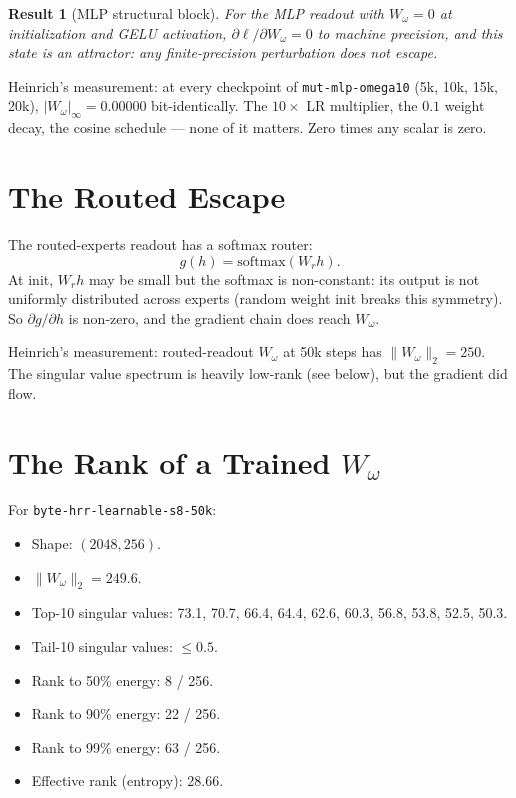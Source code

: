 \documentclass[11pt,openany]{book}
\theoremstyle{definition}
\theoremstyle{plain}
\newtheorem{result}{Result}[chapter]
\newcommand{\omegaproj}{W_\omega}
\begin{document}
\begin{result}[MLP structural block]
For the MLP readout with $\omegaproj = 0$ at initialization and GELU
activation, $\partial \ell / \partial \omegaproj = 0$ to machine
precision, and this state is an attractor: any finite-precision
perturbation does not escape.
\end{result}

Heinrich's measurement: at every checkpoint of \texttt{mut-mlp-omega10}
(5k, 10k, 15k, 20k), $|\omegaproj|_\infty = 0.00000$ bit-identically.
The $10\times$ LR multiplier, the $0.1$ weight decay, the cosine
schedule --- none of it matters. Zero times any scalar is zero.

\section{The Routed Escape}

The routed-experts readout has a softmax router:
\begin{equation}
  g(h) = \mathrm{softmax}(W_r h).
\end{equation}
At init, $W_r h$ may be small but the softmax is non-constant: its output
is not uniformly distributed across experts (random weight init breaks
this symmetry). So $\partial g / \partial h$ is non-zero, and the gradient
chain does reach $\omegaproj$.

Heinrich's measurement: routed-readout $\omegaproj$ at 50k steps has
$\|\omegaproj\|_2 = 250$. The singular value spectrum is heavily
low-rank (see below), but the gradient did flow.

\section{The Rank of a Trained $\omegaproj$}

For \texttt{byte-hrr-learnable-s8-50k}:
\begin{itemize}
  \item Shape: $(2048, 256)$.
  \item $\|\omegaproj\|_2 = 249.6$.
  \item Top-10 singular values: 73.1, 70.7, 66.4, 64.4, 62.6, 60.3,
    56.8, 53.8, 52.5, 50.3.
  \item Tail-10 singular values: $\leq 0.5$.
  \item Rank to 50\% energy: 8 / 256.
  \item Rank to 90\% energy: 22 / 256.
  \item Rank to 99\% energy: 63 / 256.
  \item Effective rank (entropy): 28.66.
\end{itemize}
\end{document}

